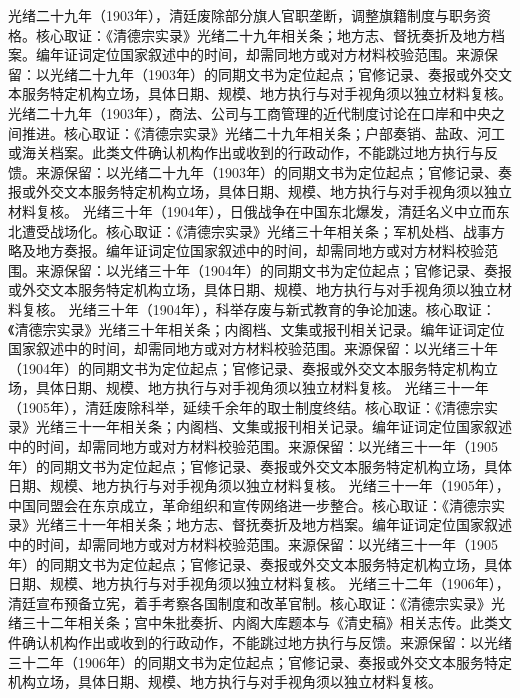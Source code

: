 光绪二十九年（1903年），清廷废除部分旗人官职垄断，调整旗籍制度与职务资格。核心取证：《清德宗实录》光绪二十九年相关条；地方志、督抚奏折及地方档案。编年证词定位国家叙述中的时间，却需同地方或对方材料校验范围。来源保留：以光绪二十九年（1903年）的同期文书为定位起点；官修记录、奏报或外交文本服务特定机构立场，具体日期、规模、地方执行与对手视角须以独立材料复核。
光绪二十九年（1903年），商法、公司与工商管理的近代制度讨论在口岸和中央之间推进。核心取证：《清德宗实录》光绪二十九年相关条；户部奏销、盐政、河工或海关档案。此类文件确认机构作出或收到的行政动作，不能跳过地方执行与反馈。来源保留：以光绪二十九年（1903年）的同期文书为定位起点；官修记录、奏报或外交文本服务特定机构立场，具体日期、规模、地方执行与对手视角须以独立材料复核。
光绪三十年（1904年），日俄战争在中国东北爆发，清廷名义中立而东北遭受战场化。核心取证：《清德宗实录》光绪三十年相关条；军机处档、战事方略及地方奏报。编年证词定位国家叙述中的时间，却需同地方或对方材料校验范围。来源保留：以光绪三十年（1904年）的同期文书为定位起点；官修记录、奏报或外交文本服务特定机构立场，具体日期、规模、地方执行与对手视角须以独立材料复核。
光绪三十年（1904年），科举存废与新式教育的争论加速。核心取证：《清德宗实录》光绪三十年相关条；内阁档、文集或报刊相关记录。编年证词定位国家叙述中的时间，却需同地方或对方材料校验范围。来源保留：以光绪三十年（1904年）的同期文书为定位起点；官修记录、奏报或外交文本服务特定机构立场，具体日期、规模、地方执行与对手视角须以独立材料复核。
光绪三十一年（1905年），清廷废除科举，延续千余年的取士制度终结。核心取证：《清德宗实录》光绪三十一年相关条；内阁档、文集或报刊相关记录。编年证词定位国家叙述中的时间，却需同地方或对方材料校验范围。来源保留：以光绪三十一年（1905年）的同期文书为定位起点；官修记录、奏报或外交文本服务特定机构立场，具体日期、规模、地方执行与对手视角须以独立材料复核。
光绪三十一年（1905年），中国同盟会在东京成立，革命组织和宣传网络进一步整合。核心取证：《清德宗实录》光绪三十一年相关条；地方志、督抚奏折及地方档案。编年证词定位国家叙述中的时间，却需同地方或对方材料校验范围。来源保留：以光绪三十一年（1905年）的同期文书为定位起点；官修记录、奏报或外交文本服务特定机构立场，具体日期、规模、地方执行与对手视角须以独立材料复核。
光绪三十二年（1906年），清廷宣布预备立宪，着手考察各国制度和改革官制。核心取证：《清德宗实录》光绪三十二年相关条；宫中朱批奏折、内阁大库题本与《清史稿》相关志传。此类文件确认机构作出或收到的行政动作，不能跳过地方执行与反馈。来源保留：以光绪三十二年（1906年）的同期文书为定位起点；官修记录、奏报或外交文本服务特定机构立场，具体日期、规模、地方执行与对手视角须以独立材料复核。
